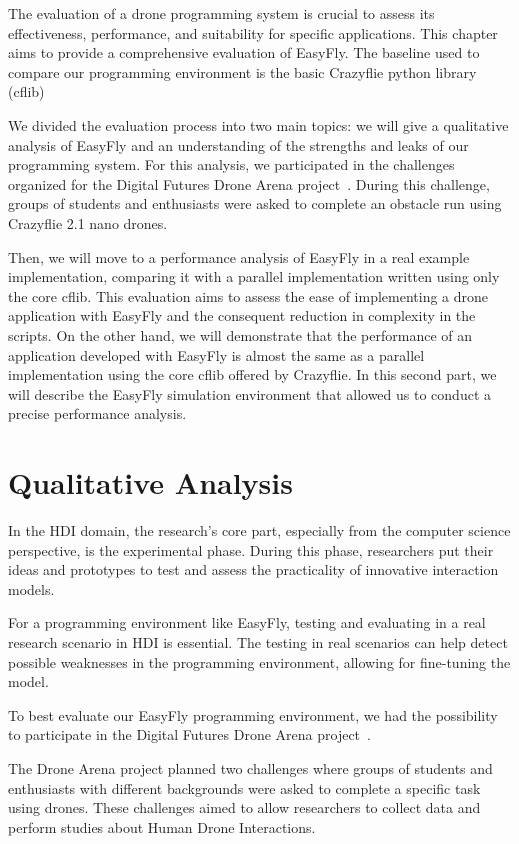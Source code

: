 The evaluation of a drone programming system is crucial to assess its effectiveness, performance, and suitability for specific applications. 
This chapter aims to provide a comprehensive evaluation of EasyFly. 
The baseline used to compare our programming environment is the basic Crazyflie python library (cflib) 

We divided the evaluation process into two main topics: we will give a qualitative analysis of EasyFly and an understanding of the strengths and leaks of our programming system.
For this analysis, we participated in the challenges organized for the Digital Futures Drone Arena project~\cite{dronearena}.
During this challenge, groups of students and enthusiasts were asked to complete an obstacle run using Crazyflie 2.1 nano drones.

Then, we will move to a performance analysis of EasyFly in a real example implementation, comparing it with a parallel implementation written using only the core cflib.
This evaluation aims to assess the ease of implementing a drone application with EasyFly and the consequent reduction in complexity in the scripts. 
On the other hand, we will demonstrate that the performance of an application developed with EasyFly is almost the same as a parallel implementation using the core cflib offered by Crazyflie.
In this second part, we will describe the EasyFly simulation environment that allowed us to conduct a precise performance analysis.

\section{Qualitative Analysis}\label{sec:qualitative_analysis}
In the HDI domain, the research's core part, especially from the computer science perspective,
is the experimental phase. During this phase, researchers put their ideas and prototypes to test
and assess the practicality of innovative interaction models.

For a programming environment like EasyFly, testing and evaluating in a real research scenario in HDI is essential. 
The testing in real scenarios can help detect possible weaknesses in the programming environment, allowing for fine-tuning the model.

To best evaluate our EasyFly programming environment, we had the possibility to participate in the Digital Futures Drone Arena project~\cite{dronearena}.

The Drone Arena project planned two challenges where groups of students and enthusiasts with different backgrounds were asked to complete a specific task using drones.
These challenges aimed to allow researchers to collect data and perform studies about Human Drone Interactions.

